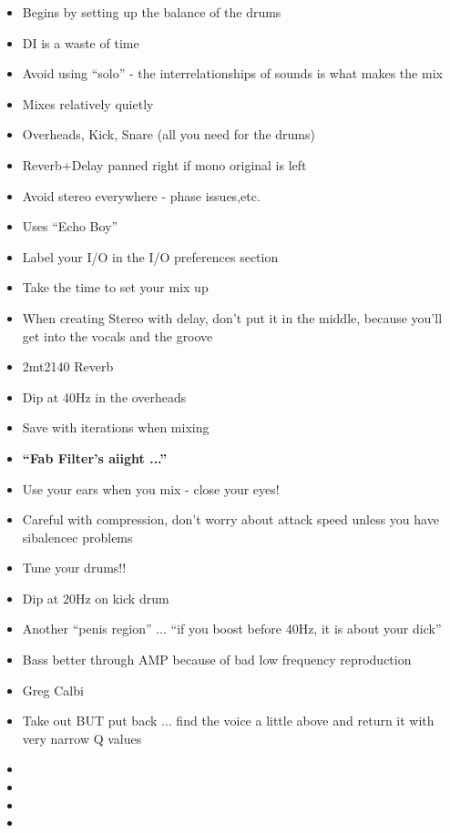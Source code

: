 \documentclass{article}
\begin{document}
\begin{itemize}
\item Begins by setting up the balance of the drums
\item DI is a waste of time
\item Avoid using ``solo'' - the interrelationships of sounds is what makes the mix
\item Mixes relatively quietly 
\item Overheads, Kick, Snare (all you need for the drums)
\item Reverb+Delay panned right if mono original is left 
\item Avoid stereo everywhere - phase issues,etc.
\item Uses ``Echo Boy''
\item Label your I/O in the I/O preferences section 
\item Take the time to set your mix up
\item When creating Stereo with delay, don't put it in the middle, because you'll get into the vocals and the groove
\item 2mt2140 Reverb
\item Dip at 40Hz in the overheads 
\item Save with iterations when mixing
\item \textbf{``Fab Filter's aiight ...''}
\item Use your ears when you mix - close your eyes!
\item Careful with compression, don't worry about attack speed unless you have sibalencec problems
\item Tune your drums!!
\item Dip at 20Hz on kick drum 
\item Another ``penis region'' ... ``if you boost before 40Hz, it is about your dick''
\item Bass better through AMP because of bad low frequency reproduction
\item Greg Calbi
\item Take out BUT put back ... find the voice a little above and return it with very narrow Q values
\item
\item
\item
\item
\end{itemize}
\end{document}
